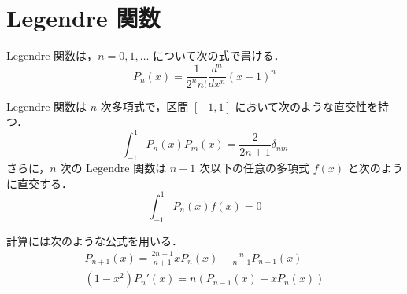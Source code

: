 %

\section{Legendre 関数}\label{sec:special-function_legendre-function}

Legendre 関数は，$n=0,1,\ldots$ について次の式で書ける．
\begin{equation}
    P_n(x) = \frac{1}{2^n n!} \frac{d^n}{dx^n} (x - 1)^n
\end{equation}

Legendre 関数は $n$ 次多項式で，区間 $[-1, 1]$ において次のような直交性を持つ．
\begin{equation}
    \int_{-1}^{1} P_n(x) P_m(x) = \frac{2}{2n + 1} \delta_{nm}
\end{equation}
さらに，$n$ 次の Legendre 関数は $n-1$ 次以下の任意の多項式 $f(x)$ と次のように直交する．
\begin{equation}
    \int_{-1}^{1} P_n(x) f(x) = 0
\end{equation}

計算には次のような公式を用いる．
\begin{gather}
    P_{n+1}(x) = \frac{2n+1}{n+1} x P_n(x) - \frac{n}{n+1} P_{n-1}(x) \\
    (1-x^2) P_n'(x) = n(P_{n-1}(x) - x P_n(x))
\end{gather}
